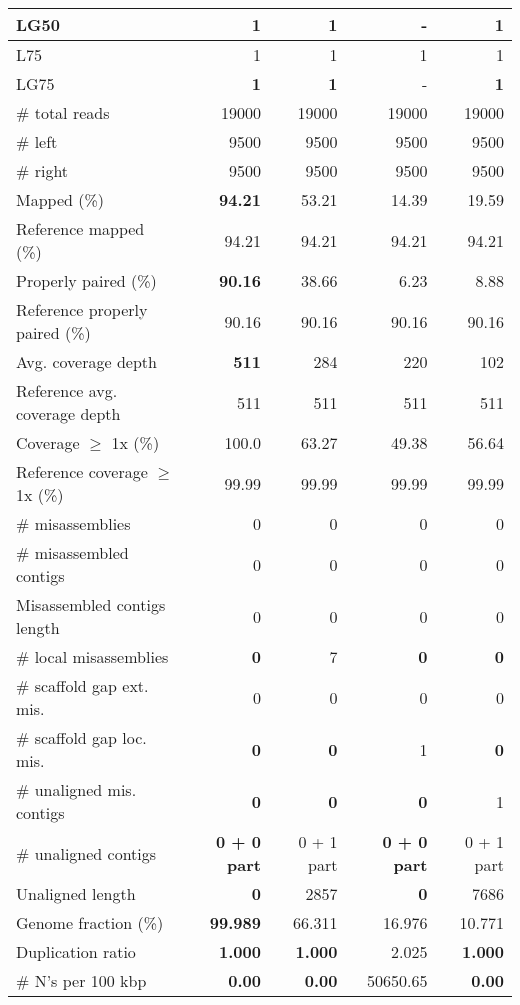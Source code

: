 \documentclass[12pt,a4paper]{article}
\begin{document}
\begin{table}[ht]
\begin{center}
\begin{tabular}{|l*{4}{|r}|}
LG50 & {\bf 1} & {\bf 1} & - & {\bf 1} \\ \hline
L75 & 1 & 1 & 1 & 1 \\ \hline
LG75 & {\bf 1} & {\bf 1} & - & {\bf 1} \\ \hline
\# total reads & 19000 & 19000 & 19000 & 19000 \\ \hline
\# left & 9500 & 9500 & 9500 & 9500 \\ \hline
\# right & 9500 & 9500 & 9500 & 9500 \\ \hline
Mapped (\%) & {\bf 94.21} & 53.21 & 14.39 & 19.59 \\ \hline
Reference mapped (\%) & 94.21 & 94.21 & 94.21 & 94.21 \\ \hline
Properly paired (\%) & {\bf 90.16} & 38.66 & 6.23 & 8.88 \\ \hline
Reference properly paired (\%) & 90.16 & 90.16 & 90.16 & 90.16 \\ \hline
Avg. coverage depth & {\bf 511} & 284 & 220 & 102 \\ \hline
Reference avg. coverage depth & 511 & 511 & 511 & 511 \\ \hline
Coverage $\geq$ 1x (\%) & 100.0 & 63.27 & 49.38 & 56.64 \\ \hline
Reference coverage $\geq$ 1x (\%) & 99.99 & 99.99 & 99.99 & 99.99 \\ \hline
\# misassemblies & 0 & 0 & 0 & 0 \\ \hline
\# misassembled contigs & 0 & 0 & 0 & 0 \\ \hline
Misassembled contigs length & 0 & 0 & 0 & 0 \\ \hline
\# local misassemblies & {\bf 0} & 7 & {\bf 0} & {\bf 0} \\ \hline
\# scaffold gap ext. mis. & 0 & 0 & 0 & 0 \\ \hline
\# scaffold gap loc. mis. & {\bf 0} & {\bf 0} & 1 & {\bf 0} \\ \hline
\# unaligned mis. contigs & {\bf 0} & {\bf 0} & {\bf 0} & 1 \\ \hline
\# unaligned contigs & {\bf 0 + 0 part} & 0 + 1 part & {\bf 0 + 0 part} & 0 + 1 part \\ \hline
Unaligned length & {\bf 0} & 2857 & {\bf 0} & 7686 \\ \hline
Genome fraction (\%) & {\bf 99.989} & 66.311 & 16.976 & 10.771 \\ \hline
Duplication ratio & {\bf 1.000} & {\bf 1.000} & 2.025 & {\bf 1.000} \\ \hline
\# N's per 100 kbp & {\bf 0.00} & {\bf 0.00} & 50650.65 & {\bf 0.00} \\ \hline

\end{tabular}
\end{center}
\end{table}
\end{document}
